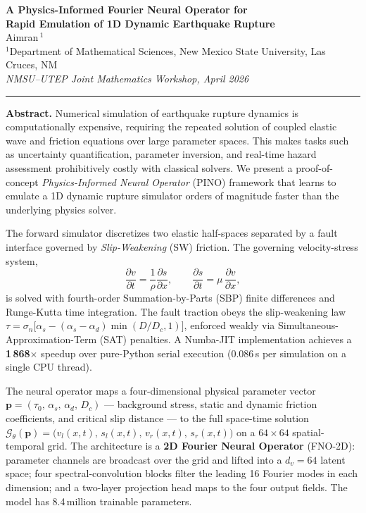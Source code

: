 \documentclass[12pt]{article}
\begin{document}
\begin{center}
  {\large \textbf{A Physics-Informed Fourier Neural Operator for\\[4pt]
  Rapid Emulation of 1D Dynamic Earthquake Rupture}}\\[10pt]

  Aimran\,$^1$\\[4pt]
  {\small $^1$Department of Mathematical Sciences,
           New Mexico State University, Las Cruces, NM}\\[4pt]
  {\small \textit{NMSU--UTEP Joint Mathematics Workshop, April 2026}}
\end{center}

\vspace{6pt}
\hrule
\vspace{10pt}

\noindent
\textbf{Abstract.}\;
Numerical simulation of earthquake rupture dynamics is computationally
expensive, requiring the repeated solution of coupled elastic wave and
friction equations over large parameter spaces.
This makes tasks such as uncertainty quantification, parameter inversion,
and real-time hazard assessment prohibitively costly with classical solvers.
We present a proof-of-concept \emph{Physics-Informed Neural Operator}
(PINO) framework that learns to emulate a 1D dynamic rupture simulator
orders of magnitude faster than the underlying physics solver.

The forward simulator discretizes two elastic half-spaces separated by a
fault interface governed by \emph{Slip-Weakening} (SW) friction.
The governing velocity-stress system,
\begin{equation}
  \frac{\partial v}{\partial t} = \frac{1}{\rho}\frac{\partial s}{\partial x},
  \qquad
  \frac{\partial s}{\partial t} = \mu\,\frac{\partial v}{\partial x},
\end{equation}
is solved with fourth-order Summation-by-Parts (SBP) finite differences and
Runge-Kutta time integration.
The fault traction obeys the slip-weakening law
$\tau = \sigma_n\bigl[\alpha_s - (\alpha_s-\alpha_d)\min(D/D_c,1)\bigr]$,
enforced weakly via Simultaneous-Approximation-Term (SAT) penalties.
A Numba-JIT implementation achieves a \textbf{1\,868$\times$} speedup over
pure-Python serial execution (0.086\,s per simulation on a single CPU thread).

The neural operator maps a four-dimensional physical parameter vector
$\mathbf{p} = (\tau_0,\,\alpha_s,\,\alpha_d,\,D_c)$ — background stress,
static and dynamic friction coefficients, and critical slip distance — to the
full space-time solution
$\mathcal{G}_\theta(\mathbf{p}) = \bigl(v_l(x,t),\,s_l(x,t),\,v_r(x,t),\,s_r(x,t)\bigr)$
on a $64\times 64$ spatial-temporal grid.
The architecture is a \textbf{2D Fourier Neural Operator} (FNO-2D):
parameter channels are broadcast over the grid and lifted into a
$d_v\!=\!64$ latent space; four spectral-convolution blocks filter the
leading 16 Fourier modes in each dimension; and a two-layer projection
head maps to the four output fields.
The model has 8.4\,million trainable parameters.
\end{document}
